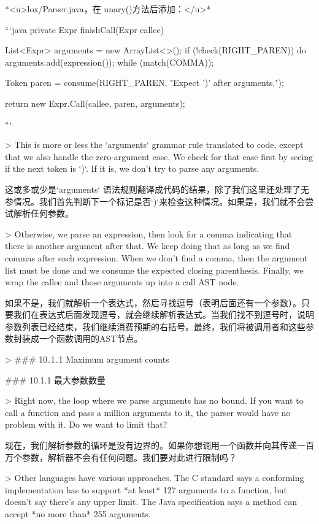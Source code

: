 \documentclass[cn,11pt,chinese]{elegantbook}
\begin{document}
*<u>lox/Parser.java，在 unary()方法后添加：</u>*

```java
  private Expr finishCall(Expr callee) {
    List<Expr> arguments = new ArrayList<>();
    if (!check(RIGHT_PAREN)) {
      do {
        arguments.add(expression());
      } while (match(COMMA));
    }

    Token paren = consume(RIGHT_PAREN,
                          "Expect ')' after arguments.");

    return new Expr.Call(callee, paren, arguments);
  }
```

> This is more or less the `arguments` grammar rule translated to code, except that we also handle the zero-argument case. We check for that case first by seeing if the next token is `)`. If it is, we don’t try to parse any arguments.

这或多或少是`arguments` 语法规则翻译成代码的结果，除了我们这里还处理了无参情况。我们首先判断下一个标记是否`)`来检查这种情况。如果是，我们就不会尝试解析任何参数。

> Otherwise, we parse an expression, then look for a comma indicating that there is another argument after that. We keep doing that as long as we find commas after each expression. When we don’t find a comma, then the argument list must be done and we consume the expected closing parenthesis. Finally, we wrap the callee and those arguments up into a call AST node.

如果不是，我们就解析一个表达式，然后寻找逗号（表明后面还有一个参数）。只要我们在表达式后面发现逗号，就会继续解析表达式。当我们找不到逗号时，说明参数列表已经结束，我们继续消费预期的右括号。最终，我们将被调用者和这些参数封装成一个函数调用的AST节点。

> ### 10 . 1 . 1 Maximum argument counts

### 10.1.1  最大参数数量

> Right now, the loop where we parse arguments has no bound. If you want to call a function and pass a million arguments to it, the parser would have no problem with it. Do we want to limit that?

现在，我们解析参数的循环是没有边界的。如果你想调用一个函数并向其传递一百万个参数，解析器不会有任何问题。我们要对此进行限制吗？

> Other languages have various approaches. The C standard says a conforming implementation has to support *at least* 127 arguments to a function, but doesn’t say there’s any upper limit. The Java specification says a method can accept *no more than* 255 arguments.
\end{document}

